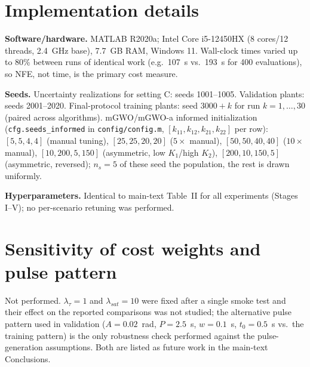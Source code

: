 \documentclass[10pt,journal,compsoc]{IEEEtran}
\newcommand{\mgwo}{mGWO}
\newcommand{\mgwoa}{mGWO-a}
\begin{document}
\section{Implementation details}\label{sec:s5}
\textbf{Software/hardware.} MATLAB R2020a; Intel Core i5-12450HX (8 cores/12 threads, 2.4~GHz base), 7.7~GB RAM, Windows 11. Wall-clock times varied up to 80\% between runs of identical work (e.g.\ 107~s vs.\ 193~s for 400 evaluations), so NFE, not time, is the primary cost measure.

\textbf{Seeds.} Uncertainty realizations for setting C: seeds 1001--1005. Validation plants: seeds 2001--2020. Final-protocol training plants: seed $3000+k$ for run $k=1,\dots,30$ (paired across algorithms). \mgwo{}/\mgwoa{} informed initialization (\texttt{cfg.seeds\_informed} in \texttt{config/config.m}, $[k_{11},k_{12},k_{21},k_{22}]$ per row): $[5,5,4,4]$ (manual tuning), $[25,25,20,20]$ ($5\times$ manual), $[50,50,40,40]$ ($10\times$ manual), $[10,200,5,150]$ (asymmetric, low $K_1$/high $K_2$), $[200,10,150,5]$ (asymmetric, reversed); $n_s=5$ of these seed the population, the rest is drawn uniformly.

\textbf{Hyperparameters.} Identical to main-text Table~II for all experiments (Stages I--V); no per-scenario retuning was performed.

\section{Sensitivity of cost weights and pulse pattern}\label{sec:s6}
Not performed. $\lambda_\tau=1$ and $\lambda_{sat}=10$ were fixed after a single smoke test and their effect on the reported comparisons was not studied; the alternative pulse pattern used in validation ($A=0.02$~rad, $P=2.5$~s, $w=0.1$~s, $t_0=0.5$~s vs.\ the training pattern) is the only robustness check performed against the pulse-generation assumptions. Both are listed as future work in the main-text Conclusions.
\end{document}
